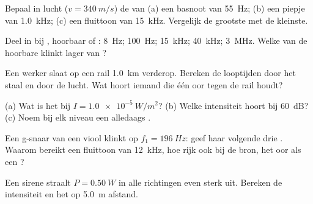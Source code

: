 \begin{exercise}[$\star$]\label{exo:g12:sound-acoustics:1}
Bepaal in lucht ($v = \qty{340}{m/s}$) de  van (a) een basnoot
van \qty{55}{Hz}; (b) een piepje van \qty{1.0}{kHz}; (c) een fluittoon van
\qty{15}{kHz}. Vergelijk de grootste met de kleinste.
\end{exercise}

\begin{exercise}[$\star$]\label{exo:g12:sound-acoustics:2}
Deel in bij , hoorbaar  of : \qty{8}{Hz};
\qty{100}{Hz}; \qty{15}{kHz}; \qty{40}{kHz}; \qty{3}{MHz}. Welke van de
hoorbare klinkt lager van ?
\end{exercise}

\begin{exercise}[$\star$]\label{exo:g12:sound-acoustics:3}
Een werker slaat op een rail \qty{1.0}{km} verderop. Bereken de
looptijden door het staal en door de lucht. Wat hoort iemand die één oor
tegen de rail houdt?
\end{exercise}

\begin{exercise}[$\star$]\label{exo:g12:sound-acoustics:4}
(a) Wat is het  bij $I = \qty{1.0e-5}{W/m^2}$? (b) Welke
intensiteit hoort bij \qty{60}{dB}? (c) Noem bij elk niveau een
alledaags .
\end{exercise}

\begin{exercise}[$\star$]\label{exo:g12:sound-acoustics:5}
Een g-snaar van een viool klinkt op $f_1 = \qty{196}{Hz}$: geef haar
volgende drie . Waarom bereikt een fluittoon van \qty{12}{kHz},
hoe rijk ook bij de bron, het oor als een ?
\end{exercise}

\begin{exercise}[$\star\star$]\label{exo:g12:sound-acoustics:6}
Een sirene straalt $P = \qty{0.50}{W}$ in alle richtingen even sterk uit.
Bereken de intensiteit en het  op \qty{5.0}{m} afstand.
\end{exercise}


